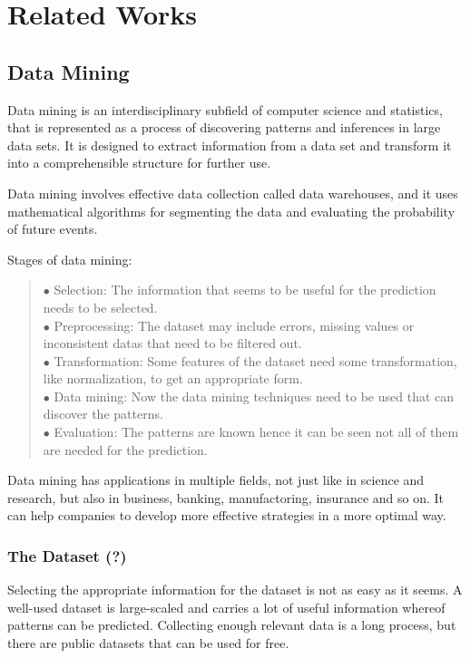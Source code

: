 \chapter{Related Works}

\section{Data Mining}

Data mining is an interdisciplinary subfield of computer science and statistics, that is represented as a process of discovering patterns and inferences in large data sets. It is designed to extract information from a data set and transform it into a comprehensible structure for further use. \medskip

Data mining involves effective data collection called data warehouses, and it uses mathematical algorithms for segmenting the data and evaluating the probability of future events. 

\smallskip \noindent Stages of data mining:
\begin{verse}
	$\bullet$ Selection: The information that seems to be useful for the prediction needs to be selected.\\
	$\bullet$ Preprocessing: The dataset may include errors, missing values or inconsistent datas that need to be filtered out.\\
	$\bullet$ Transformation: Some features of the dataset need some transformation, like normalization, to get an appropriate form.\\
	$\bullet$ Data mining: Now the data mining techniques need to be used that can discover the patterns.\\
	$\bullet$ Evaluation: The patterns are known hence it can be seen not all of them are needed for the prediction.
\end{verse}

Data mining has applications in multiple fields, not just like in science and research, but also in business, banking, manufactoring, insurance and so on. It can help companies to develop more effective strategies in a more optimal way.



\subsection{The Dataset (?)}

Selecting the appropriate information for the dataset is not as easy as it seems. A well-used dataset is large-scaled and carries a lot of useful information whereof patterns can be predicted. Collecting enough relevant data is a long process, but there are public datasets that can be used for free. \medskip

